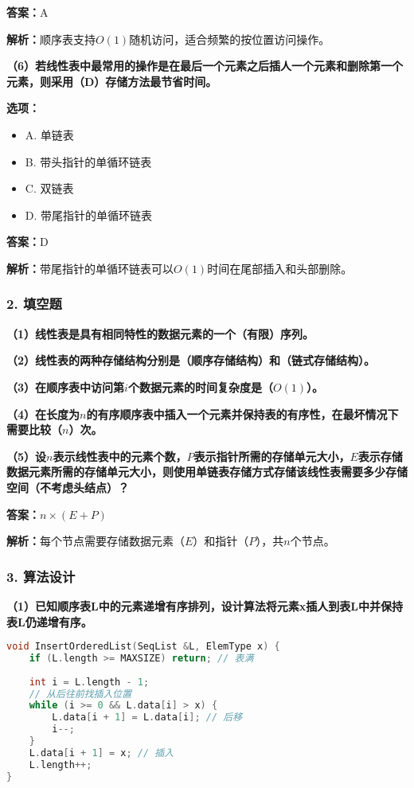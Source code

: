 \documentclass[12pt,a4paper]{amsart}
\begin{document}
\textbf{答案：}A

\textbf{解析：}顺序表支持$O(1)$随机访问，适合频繁的按位置访问操作。

\textbf{（6）若线性表中最常用的操作是在最后一个元素之后插人一个元素和删除第一个元素，则采用（D）存储方法最节省时间。}

\textbf{选项：}
\begin{itemize}
\item A. 单链表
\item B. 带头指针的单循环链表
\item C. 双链表
\item D. 带尾指针的单循环链表
\end{itemize}

\textbf{答案：}D

\textbf{解析：}带尾指针的单循环链表可以$O(1)$时间在尾部插入和头部删除。

\subsubsection{2. 填空题}

\textbf{（1）线性表是具有相同特性的数据元素的一个（有限）序列。}

\textbf{（2）线性表的两种存储结构分别是（顺序存储结构）和（链式存储结构）。}

\textbf{（3）在顺序表中访问第$i$个数据元素的时间复杂度是（$O(1)$）。}

\textbf{（4）在长度为$n$的有序顺序表中插入一个元素并保持表的有序性，在最坏情况下需要比较（$n$）次。}

\textbf{（5）设$n$表示线性表中的元素个数，$P$表示指针所需的存储单元大小，$E$表示存储数据元素所需的存储单元大小，则使用单链表存储方式存储该线性表需要多少存储空间（不考虑头结点）？}

\textbf{答案：}$n \times (E + P)$

\textbf{解析：}每个节点需要存储数据元素（$E$）和指针（$P$），共$n$个节点。

\subsubsection{3. 算法设计}

\textbf{（1）已知顺序表L中的元素递增有序排列，设计算法将元素x插人到表L中并保持表L仍递增有序。}

\begin{lstlisting}[language=C++]
void InsertOrderedList(SeqList &L, ElemType x) {
    if (L.length >= MAXSIZE) return; // 表满
    
    int i = L.length - 1;
    // 从后往前找插入位置
    while (i >= 0 && L.data[i] > x) {
        L.data[i + 1] = L.data[i]; // 后移
        i--;
    }
    L.data[i + 1] = x; // 插入
    L.length++;
}
\end{lstlisting}
\end{document}
